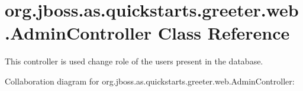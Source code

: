\hypertarget{classorg_1_1jboss_1_1as_1_1quickstarts_1_1greeter_1_1web_1_1_admin_controller}{}\section{org.\+jboss.\+as.\+quickstarts.\+greeter.\+web.\+Admin\+Controller Class Reference}
\label{classorg_1_1jboss_1_1as_1_1quickstarts_1_1greeter_1_1web_1_1_admin_controller}


This controller is used change role of the users present in the database.  




Collaboration diagram for org.\+jboss.\+as.\+quickstarts.\+greeter.\+web.\+Admin\+Controller\+:
